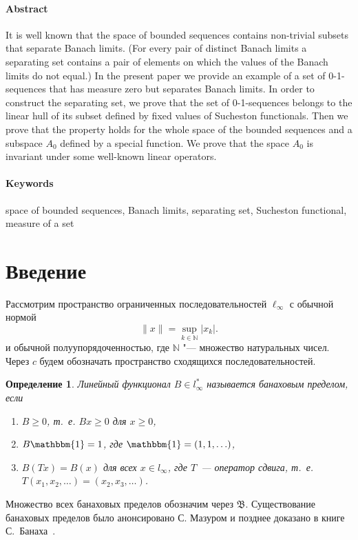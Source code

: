 \documentclass[a4paper,14pt]{article} %
\theoremstyle{plain}
\newtheorem{definition}[lemma]{Определение}
\begin{document}
\paragraph{Abstract}
It is well known that the space of bounded sequences contains non-trivial subsets
that separate Banach limits.
(For every pair of distinct Banach limits a separating set contains a pair of elements
on which the values of the Banach limits do not equal.)
In the present paper we provide an example of a set of 0-1-sequences that has measure zero
but separates Banach limits.
In order to construct the separating set, we prove that
the set of 0-1-sequences belongs to the linear hull of its subset
defined by fixed values of Sucheston functionals.
Then we prove that the property holds for the whole space of the bounded sequences
and a subspace $A_0$ defined by a special function.
We prove that the space $A_0$ is invariant under some well-known linear operators.




\paragraph{Keywords}
	space of bounded sequences,
	Banach limits,
	separating set,
	Sucheston functional,
	measure of a set



\section{Введение}

Рассмотрим пространство ограниченных последовательностей $\ell_\infty$ с обычной нормой
\begin{equation*}
	\|x\| = \sup_{k\in\mathbb{N}} |x_k|
	.
\end{equation*}
и обычной полуупорядоченностью, где $\mathbb{N}$ "--- множество натуральных чисел.
Через $c$ будем обозначать пространство сходящихся последовательностей.


\begin{definition}
	Линейный функционал $B\in l_\infty^*$ называется банаховым пределом,
	если
	\begin{enumerate}
		\item
			$B\geq0$, т.~е. $Bx \geq 0$ для $x \geq 0$,
		\item
			$B\mathbbm{1}=1$, где $\mathbbm{1} =(1,1,\ldots)$,
		\item
			$B(Tx)=B(x)$ для всех $x\in l_\infty$, где $T$~---
		оператор сдвига, т.~е. $T(x_1,x_2,\ldots)=(x_2,x_3,\ldots)$.
	\end{enumerate}
\end{definition}
Множество всех банаховых пределов обозначим через $\mathfrak{B}$.
Существование банаховых пределов было анонсировано С. Мазуром \cite{Mazur} и позднее доказано в книге С.~Банаха~\cite{B}. 
\end{document}
